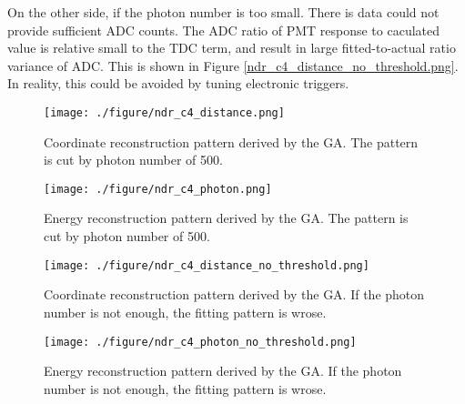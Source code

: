



On the other side, if the photon number is too small. There is data could not provide sufficient ADC counts.
The ADC ratio of PMT response to caculated value is relative small to the TDC term, and result in large
fitted-to-actual ratio variance of ADC. This is shown in Figure \ref{ndr_c4_distance_no_threshold.png}.
In reality, this could be avoided by tuning electronic triggers.



\begin{figure}[h]
    \centering
    \texttt{[image: ./figure/ndr\_c4\_distance.png]}
    \caption[Coordinate reconstruction I]
{
Coordinate reconstruction pattern derived by the GA.
The pattern is cut by photon number of 500.
}
    \label{fig:ndr_c4_distance.png}
    \end{figure}



\begin{figure}[h]
    \centering
    \texttt{[image: ./figure/ndr\_c4\_photon.png]}
    \caption[Energy reconstruction I]
{
Energy reconstruction pattern derived by the GA.
The pattern is cut by photon number of 500.
}
    \label{fig:ndr_c4_photon.png}
    \end{figure}

\begin{figure}[h]
    \centering
    \texttt{[image: ./figure/ndr\_c4\_distance\_no\_threshold.png]}
    \caption[Coordinate reconstruction without threshold]
{
Coordinate reconstruction pattern derived by the GA.
If the photon number is not enough, the fitting pattern is wrose.
}
    \label{fig:ndr_c4_distance_no_threshold.png}
    \end{figure}



\begin{figure}[h]
    \centering
    \texttt{[image: ./figure/ndr\_c4\_photon\_no\_threshold.png]}
    \caption[Energy reconstruction without threshold]
{
Energy reconstruction pattern derived by the GA.
If the photon number is not enough, the fitting pattern is wrose.
}
    \label{fig:ndr_c4_photon_no_threshold.png}
    \end{figure}

